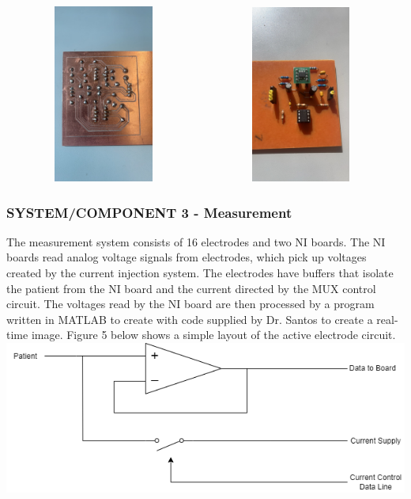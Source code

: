 \documentclass[12pt]{article}
\begin{document}
\includegraphics[width=2.56253in,height=2.30215in]{media/image6.jpeg}\includegraphics[width=2.6386in,height=2.29158in]{media/image7.jpeg}

\subsubsection{SYSTEM/COMPONENT 3 - Measurement}\label{systemcomponent-3---measurement}

The measurement system consists of 16 electrodes and two NI boards. The
NI boards read analog voltage signals from electrodes, which pick up
voltages created by the current injection system. The electrodes have
buffers that isolate the patient from the NI board and the current
directed by the MUX control circuit. The voltages read by the NI board
are then processed by a program written in MATLAB to create with code
supplied by Dr. Santos to create a real-time image. Figure 5 below shows
a simple layout of the active electrode circuit.
\includegraphics{media/image8.png}
\end{document}
